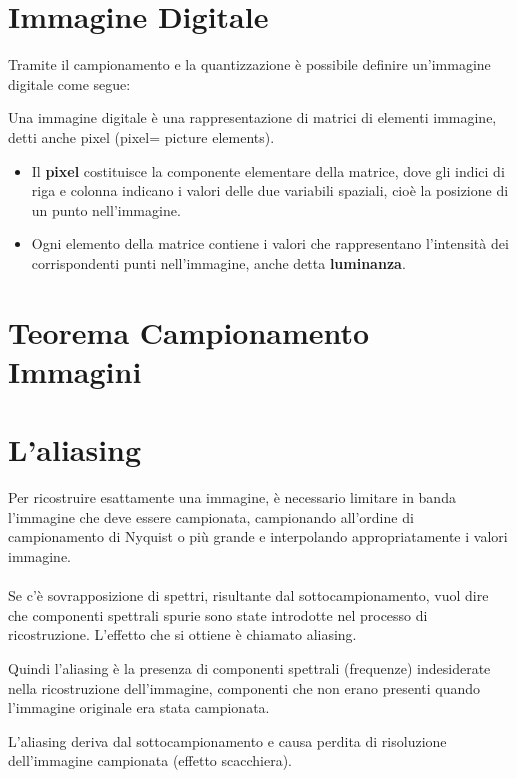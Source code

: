 \section{Immagine Digitale}
Tramite il campionamento e la quantizzazione è possibile definire
un’immagine digitale come segue:
\begin{definition}
    Una immagine digitale è una rappresentazione di matrici di
    elementi immagine, detti anche pixel (pixel= picture elements).
\end{definition}
\begin{itemize}
    \item Il \textbf{pixel} costituisce la componente elementare della matrice,
          dove gli indici di riga e colonna indicano i valori delle due
          variabili spaziali, cioè la posizione di un punto nell’immagine.
    \item Ogni elemento della matrice contiene i valori che
          rappresentano l’intensità dei corrispondenti punti
          nell’immagine, anche detta \textbf{luminanza}.
\end{itemize}
\section{Teorema Campionamento Immagini}
\section{L'aliasing}
Per ricostruire esattamente una immagine, è necessario limitare in
banda l’immagine che deve essere campionata, campionando all’ordine di campionamento di Nyquist o più grande e
interpolando appropriatamente i valori immagine.
\\\\Se c’è sovrapposizione di spettri, risultante dal
sottocampionamento, vuol dire che componenti spettrali spurie
sono state introdotte nel processo di ricostruzione. L’effetto che si
ottiene è chiamato aliasing.

Quindi l'aliasing è la presenza di componenti spettrali (frequenze)
indesiderate nella ricostruzione dell’immagine, componenti che non
erano presenti quando l’immagine originale era stata campionata.


L’aliasing deriva dal sottocampionamento e causa perdita di
risoluzione dell’immagine campionata (effetto scacchiera).

